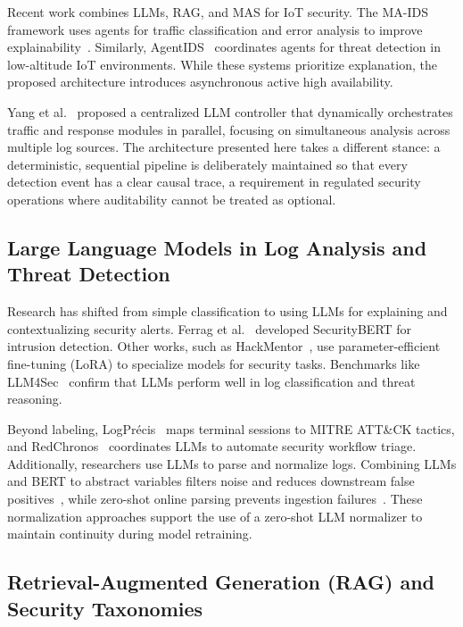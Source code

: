 \documentclass[conference]{IEEEtran}
\begin{document}
Recent work combines LLMs, RAG, and MAS for IoT security. The MA-IDS framework uses agents for traffic classification and error analysis to improve explainability~\cite{maids2026}. Similarly, AgentIDS~\cite{li2026agentids} coordinates agents for threat detection in low-altitude IoT environments. While these systems prioritize explanation, the proposed architecture introduces asynchronous active high availability.

Yang et al.~\cite{yang2025llmcontroller} proposed a centralized LLM controller that dynamically orchestrates traffic and response modules in parallel, focusing on simultaneous analysis across multiple log sources. The architecture presented here takes a different stance: a deterministic, sequential pipeline is deliberately maintained so that every detection event has a clear causal trace, a requirement in regulated security operations where auditability cannot be treated as optional.

\subsection{Large Language Models in Log Analysis and Threat Detection}

Research has shifted from simple classification to using LLMs for explaining and contextualizing security alerts. Ferrag et al.~\cite{ferrag2024securitybert} developed SecurityBERT for intrusion detection. Other works, such as HackMentor~\cite{zhang2023hackmentor}, use parameter-efficient fine-tuning (LoRA) to specialize models for security tasks. Benchmarks like LLM4Sec~\cite{karlsen2024llm4sec} confirm that LLMs perform well in log classification and threat reasoning.

Beyond labeling, LogPr\'{e}cis~\cite{boffa2024logprecis} maps terminal sessions to MITRE ATT\&CK tactics, and RedChronos~\cite{li2025redchronos} coordinates LLMs to automate security workflow triage. Additionally, researchers use LLMs to parse and normalize logs. Combining LLMs and BERT to abstract variables filters noise and reduces downstream false positives~\cite{leveragingllmbert2024}, while zero-shot online parsing prevents ingestion failures~\cite{llmzerolog2025}. These normalization approaches support the use of a zero-shot LLM normalizer to maintain continuity during model retraining.

\subsection{Retrieval-Augmented Generation (RAG) and Security Taxonomies}
\label{subsec:rag}
\end{document}
